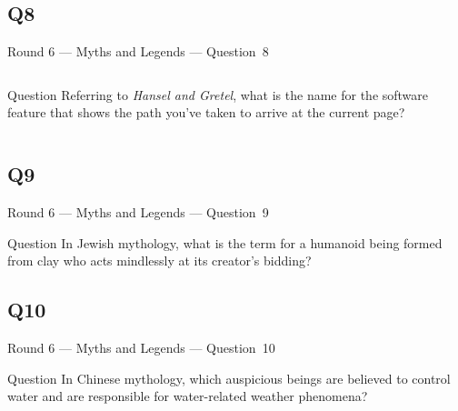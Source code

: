 \documentclass[11pt]{beamer}
\begin{document}
\subsection*{Q8}
\begin{frame}[t]{Round 6 --- Myths and Legends --- \mbox{Question 8}}
\vspace{-0.5em}
\begin{columns}[T,totalwidth=\linewidth]
\begin{column}{0.32\linewidth}
\begin{block}{Question}
Referring to \emph{Hansel and Gretel}, what is the name for the software feature that shows the path you've taken to arrive at the current page?
\end{block}
\end{column}
\begin{column}{0.65\linewidth}
\begin{center}
\texttt{[image: \{Images/breadcrumbs]}.png}
\end{center}
\end{column}
\end{columns}
\end{frame}
\subsection*{Q9}
\begin{frame}[t]{Round 6 --- Myths and Legends --- \mbox{Question 9}}
\vspace{-0.5em}
\begin{block}{Question}
In Jewish mythology, what is the term for a humanoid being formed from clay who acts mindlessly at its creator's bidding?
\end{block}
\end{frame}
\subsection*{Q10}
\begin{frame}[t]{Round 6 --- Myths and Legends --- \mbox{Question 10}}
\vspace{-0.5em}
\begin{block}{Question}
In Chinese mythology, which auspicious beings are believed to control water and are responsible for water-related weather phenomena?
\end{block}
\end{frame}
\end{document}

